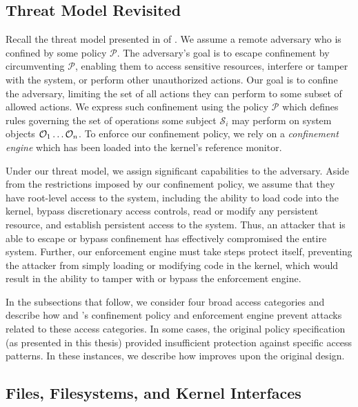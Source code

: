 \subsection{Threat Model Revisited}

Recall the threat model presented in  of
. We assume a remote adversary who is confined by some policy
$\mathcal{P}$. The adversary's goal is to escape confinement by circumventing
$\mathcal{P}$, enabling them to access sensitive resources, interfere or tamper with the
system, or perform other unauthorized actions. Our goal is to confine the adversary,
limiting the set of all actions they can perform to some subset of allowed actions. We
express such confinement using the policy $\mathcal{P}$ which defines rules governing the
set of operations some subject $\mathcal{S}_i$ may perform on system objects
$\mathcal{O}_1 \mathellipsis \mathcal{O}_n$. To enforce our confinement policy, we rely on
a \textit{confinement engine} which has been loaded into the kernel's reference monitor.

Under our threat model, we assign significant capabilities to the adversary. Aside from the
restrictions imposed by our confinement policy, we assume that they have root-level access
to the system, including the ability to load code into the kernel, bypass discretionary
access controls, read or modify any persistent resource, and establish persistent access
to the system. Thus, an attacker that is able to escape or bypass confinement has
effectively compromised the entire system. Further, our enforcement engine must take steps
protect itself, preventing the attacker from simply loading or modifying code in the
kernel, which would result in the ability to tamper with or bypass the enforcement engine.

In the subsections that follow, we consider four broad access categories and describe how
\bpfbox{} and \bpfcontain{}'s confinement policy and enforcement engine prevent attacks
related to these access categories. In some cases, the original \bpfbox{} policy
specification (as presented in this thesis) provided insufficient protection against
specific access patterns. In these instances, we describe how \bpfcontain{} improves upon
the original \bpfbox{} design.

\subsection{Files, Filesystems, and Kernel Interfaces}

